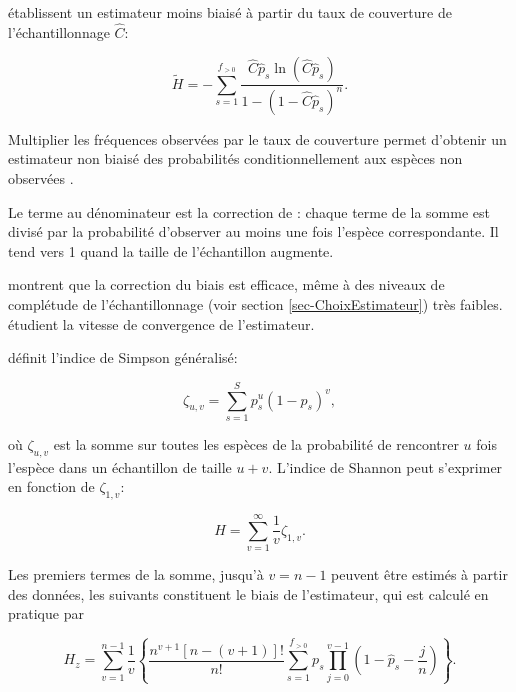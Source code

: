 \documentclass[
  11pt,
  american,
  a4paper,
  extrafontsizes,onecolumn,openright
  ]{memoir}
\begin{document}
\textcite{Chao2003} établissent un estimateur moins biaisé à partir du taux de couverture de l'échantillonnage \(\hat{C}\):

\begin{equation}
  \label{eq:ChaoShen}
  \tilde{H} 
  = -\sum_{s=1}^{f_{>0}}{\frac
    {\hat{C} \hat{p}_s \ln\left( \hat{C} \hat{p}_s \right)}
    {1 - \left( 1 - \hat{C}\hat{p}_s \right)^n}}.
\end{equation}

Multiplier les fréquences observées par le taux de couverture permet d'obtenir un estimateur non biaisé des probabilités conditionnellement aux espèces non observées \autocite{Ashbridge2000}.

Le terme au dénominateur est la correction de \textcite{Horvitz1952}: chaque terme de la somme est divisé par la probabilité d'observer au moins une fois l'espèce correspondante.
Il tend vers 1 quand la taille de l'échantillon augmente.

\textcite{Beck2010} montrent que la correction du biais est efficace, même à des niveaux de complétude de l'échantillonnage (voir section \ref{sec-ChoixEstimateur}) très faibles. \textcite{Vu2007} étudient la vitesse de convergence de l'estimateur.

\textcite{Zhang2012} définit l'indice de Simpson généralisé:

\begin{equation}
  \label{eq:zeta}
  \zeta_{u,v} = \sum^S_{s=1}{p^u_s{\left( 1 - p_s \right)}^v},
\end{equation}

où \(\zeta_{u,v}\) est la somme sur toutes les espèces de la probabilité de rencontrer \(u\) fois l'espèce dans un échantillon de taille \(u+v\).
L'indice de Shannon peut s'exprimer en fonction de \(\zeta_{1,v}\):

\begin{equation}
  \label{eq:HzetaInf}
  H = \sum^{\infty}_{v=1}{\frac{1}{v} \zeta_{1,v}}.
\end{equation}

Les premiers termes de la somme, jusqu'à \(v=n-1\) peuvent être estimés à partir des données, les suivants constituent le biais de l'estimateur, qui est calculé en pratique par

\begin{equation}
  \label{eq:Hzetanu}
  H_z 
  = \sum^{n-1}_{v=1}{\frac{1}{v}\left\{
    \frac{n^{v+1}\left[ n - \left(v + 1 \right) \right]!}{n!}
    \sum^{f_{>0}}_{s=1}{p_s \prod^{v-1}_{j=0}{
      \left( 1 - \hat{p}_s - \frac{j}{n} \right)}
    }
  \right\}}.
\end{equation}
\end{document}

